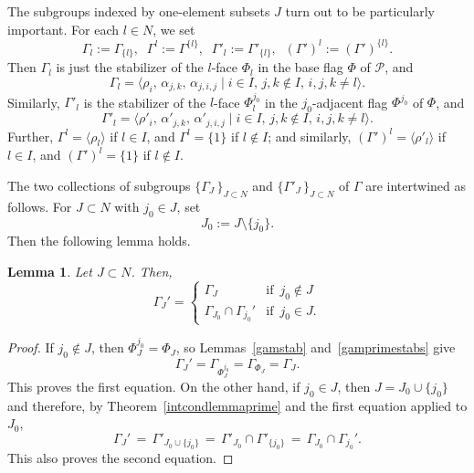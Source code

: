 \documentclass[12pt]{article}
\renewcommand{\>}{\rangle}
\newtheorem{lemma}[theorem]{Lemma}
\theoremstyle{definition}\newtheorem{definition}{Definition}[section]
\begin{document}
The subgroups indexed by one-element subsets $J$ turn out to be particularly important. For each $l\in N$, we set 
\begin{equation}
\label{gamlprime}
\Gamma_l := \Gamma_{\{l\}},\;\; \Gamma^l:=\Gamma^{\{l\}},\;\; 
\Gamma'_l := \Gamma'_{\{l\}},\;\; (\Gamma')^l:=(\Gamma')^{\{l\}}.
\end{equation}
Then $\Gamma_l$ is just the stabilizer of the $l$-face $\Phi_l$ in the base flag $\Phi$ of $\mathcal{P}$, and
\begin{equation}
\label{gamsubl}
\Gamma_l =  \langle \rho_i,\, \alpha_{j,k},\, \alpha_{j,i,j}  \mid i \in I, \, j,k \notin I, \,  i, j, k \neq l \rangle. 
\end{equation}
Similarly, $\Gamma'_{l}$ is the stabilizer of the $l$-face $\Phi_{l}^{j_0}$ in the $j_{0}$-adjacent flag $\Phi^{j_0}$ of $\Phi$, and 
\begin{equation}
\label{gamsublprime}
\Gamma'_l =  \langle \rho'_i,\, \alpha'_{j,k},\, \alpha'_{j,i,j}  \mid i \in I, \, j,k \notin I, \,  i, j, k \neq l \rangle. 
\end{equation}
Further, $\Gamma^l=\langle\rho_l\rangle$ if $l\in I$, and $\Gamma^l = \{1\}$ if $l\notin I$; and similarly, $(\Gamma')^l=\langle\rho'_l\rangle$ if $l\in I$, and $(\Gamma')^l = \{1\}$ if $l\notin I$.
\medskip

The two collections of subgroups $\big\{\Gamma_{J}\!\,\big\}_{\!J\subset N}$ and $\big\{\Gamma'_{J}\!\,\big\}_{\!J\subset N}$ of $\Gamma$ are intertwined as follows. For $J\subset N$ with $j_{0}\in J$, set 
\[J_{0}:=J\setminus\{j_0\}.\]
Then the following lemma holds.

\begin{lemma}
\label{intertwine}
Let $J\subset N$. Then, 
\[\Gamma_{J}'= \left\{
\begin{array}{ll}
\Gamma_{J} & \mbox{if }\, j_{0}\not\in J\\
\Gamma_{J_0}\cap \Gamma_{j_0}' & \mbox{if }\, j_{0}\in J.
\end{array}\right.\]
\end{lemma}

\begin{proof}
If $j_{0}\not\in J$, then $\Phi^{j_0}_J=\Phi_J$, so Lemmas~\ref{gamstab} and~\ref{gamprimestabs} give 
\[\Gamma_{J}'=\Gamma_{\Phi^{j_0}_J}=\Gamma_{\Phi_J}=\Gamma_J.\]
This proves the first equation. On the other hand, if $j_{0}\in J$, then $J=J_{0}\cup\{j_0\}$ and therefore, by Theorem~\ref{intcondlemmaprime} and the first equation applied to $J_0$,
\[\Gamma_{J}'\,=\,\Gamma'_{J_{0}\cup\{j_0\}}\,=\,\Gamma'_{J_0}\cap\Gamma'_{\{j_0\}}
\,=\, \Gamma_{J_0}\cap\Gamma_{j_0}'.\]
This also proves the second equation.
\end{proof}
\smallskip
\end{document}
